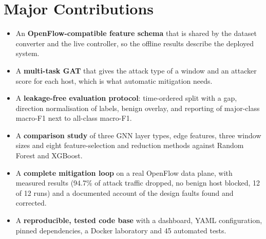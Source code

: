 \section{Major Contributions}
\begin{itemize}
	\item An \textbf{OpenFlow-compatible feature schema} that is shared by the dataset converter and the live controller, so the offline results describe the deployed system.
	\item A \textbf{multi-task GAT} that gives the attack type of a window and an attacker score for each host, which is what automatic mitigation needs.
	\item A \textbf{leakage-free evaluation protocol}: time-ordered split with a gap, direction normalisation of labels, benign overlay, and reporting of major-class macro-F1 next to all-class macro-F1.
	\item A \textbf{comparison study} of three GNN layer types, edge features, three window sizes and eight feature-selection and reduction methods against Random Forest and XGBoost.
	\item A \textbf{complete mitigation loop} on a real OpenFlow data plane, with measured results (94.7\% of attack traffic dropped, no benign host blocked, 12 of 12 runs) and a documented account of the design faults found and corrected.
	\item A \textbf{reproducible, tested code base} with a dashboard, YAML configuration, pinned dependencies, a Docker laboratory and 45 automated tests.
\end{itemize}

